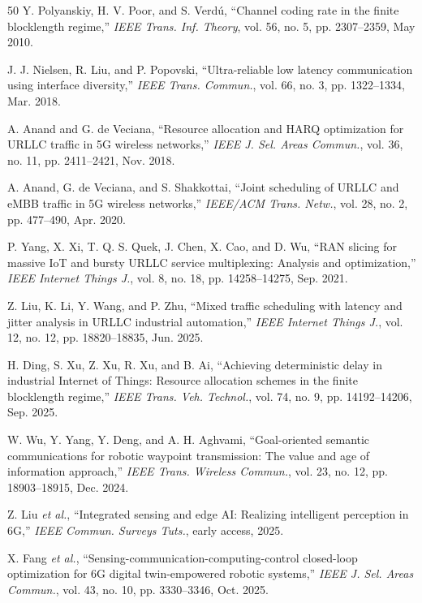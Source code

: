 \documentclass[letterpaper,journal]{IEEEtran}
\newcommand{\etal}{\emph{et al.}}
\begin{document}
\begin{thebibliography}{50}
Y. Polyanskiy, H. V. Poor, and S. Verd\'u, ``Channel coding rate in the finite
blocklength regime,'' \emph{IEEE Trans. Inf. Theory}, vol. 56, no. 5,
pp. 2307--2359, May 2010.

J. J. Nielsen, R. Liu, and P. Popovski, ``Ultra-reliable low latency
communication using interface diversity,'' \emph{IEEE Trans. Commun.},
vol. 66, no. 3, pp. 1322--1334, Mar. 2018.

A. Anand and G. de Veciana, ``Resource allocation and HARQ optimization for
URLLC traffic in 5G wireless networks,'' \emph{IEEE J. Sel. Areas Commun.},
vol. 36, no. 11, pp. 2411--2421, Nov. 2018.

A. Anand, G. de Veciana, and S. Shakkottai, ``Joint scheduling of URLLC and
eMBB traffic in 5G wireless networks,'' \emph{IEEE/ACM Trans. Netw.},
vol. 28, no. 2, pp. 477--490, Apr. 2020.

P. Yang, X. Xi, T. Q. S. Quek, J. Chen, X. Cao, and D. Wu, ``RAN slicing
for massive IoT and bursty URLLC service multiplexing: Analysis and
optimization,'' \emph{IEEE Internet Things J.}, vol. 8, no. 18,
pp. 14258--14275, Sep. 2021.

Z. Liu, K. Li, Y. Wang, and P. Zhu, ``Mixed traffic scheduling with latency
and jitter analysis in URLLC industrial automation,'' \emph{IEEE Internet
Things J.}, vol. 12, no. 12, pp. 18820--18835, Jun. 2025.

H. Ding, S. Xu, Z. Xu, R. Xu, and B. Ai, ``Achieving deterministic delay in
industrial Internet of Things: Resource allocation schemes in the finite
blocklength regime,'' \emph{IEEE Trans. Veh. Technol.}, vol. 74, no. 9,
pp. 14192--14206, Sep. 2025.

W. Wu, Y. Yang, Y. Deng, and A. H. Aghvami, ``Goal-oriented semantic
communications for robotic waypoint transmission: The value and age of
information approach,'' \emph{IEEE Trans. Wireless Commun.}, vol. 23, no. 12,
pp. 18903--18915, Dec. 2024.

Z. Liu \etal, ``Integrated sensing and edge AI: Realizing intelligent
perception in 6G,'' \emph{IEEE Commun. Surveys Tuts.}, early access, 2025.

X. Fang \etal, ``Sensing-communication-computing-control closed-loop
optimization for 6G digital twin-empowered robotic systems,'' \emph{IEEE J.
Sel. Areas Commun.}, vol. 43, no. 10, pp. 3330--3346, Oct. 2025.


\end{thebibliography}
\end{document}
